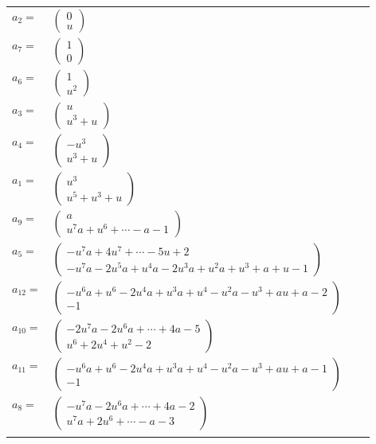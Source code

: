 \documentclass[1p]{elsarticle_modified}
\theoremstyle{definition}
\begin{document}
\begin{tabular}{m{7pt} m{180pt} m{7pt} m{180pt} }
\flushright $a_{2}=$&$\begin{pmatrix}0\\u\end{pmatrix}$ \\
\flushright $a_{7}=$&$\begin{pmatrix}1\\0\end{pmatrix}$ \\
\flushright $a_{6}=$&$\begin{pmatrix}1\\u^2\end{pmatrix}$ \\
\flushright $a_{3}=$&$\begin{pmatrix}u\\u^3+u\end{pmatrix}$ \\
\flushright $a_{4}=$&$\begin{pmatrix}- u^3\\u^3+u\end{pmatrix}$ \\
\flushright $a_{1}=$&$\begin{pmatrix}u^3\\u^5+u^3+u\end{pmatrix}$ \\
\flushright $a_{9}=$&$\begin{pmatrix}a\\u^7 a+u^6+\cdots- a-1\end{pmatrix}$ \\
\flushright $a_{5}=$&$\begin{pmatrix}- u^7 a+4 u^7+\cdots-5 u+2\\- u^7 a-2 u^5 a+u^4 a-2 u^3 a+u^2 a+u^3+a+u-1\end{pmatrix}$ \\
\flushright $a_{12}=$&$\begin{pmatrix}- u^6 a+u^6-2 u^4 a+u^3 a+u^4- u^2 a- u^3+a u+a-2\\-1\end{pmatrix}$ \\
\flushright $a_{10}=$&$\begin{pmatrix}-2 u^7 a-2 u^6 a+\cdots+4 a-5\\u^6+2 u^4+u^2-2\end{pmatrix}$ \\
\flushright $a_{11}=$&$\begin{pmatrix}- u^6 a+u^6-2 u^4 a+u^3 a+u^4- u^2 a- u^3+a u+a-1\\-1\end{pmatrix}$ \\
\flushright $a_{8}=$&$\begin{pmatrix}- u^7 a-2 u^6 a+\cdots+4 a-2\\u^7 a+2 u^6+\cdots- a-3\end{pmatrix}$\\&\end{tabular}
\end{document}
